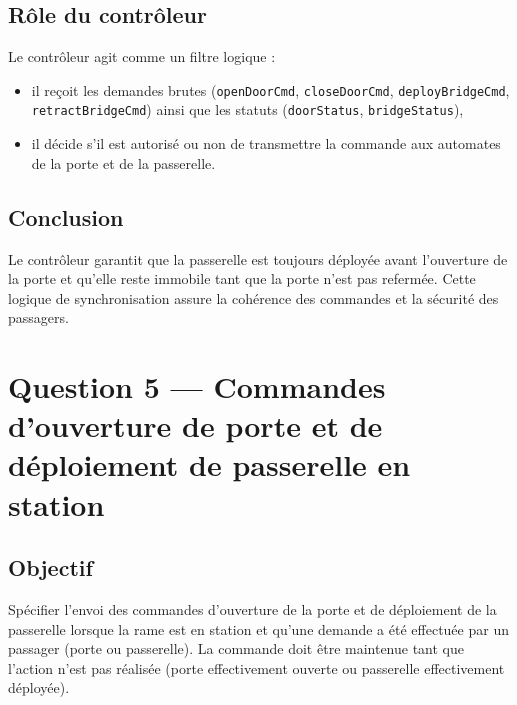 \documentclass[11pt,a4paper]{report}
\begin{document}
\section*{Rôle du contrôleur}
Le contrôleur agit comme un filtre logique :
\begin{itemize}
  \item il reçoit les demandes brutes (\texttt{openDoorCmd}, \texttt{closeDoorCmd}, \texttt{deployBridgeCmd}, \texttt{retractBridgeCmd}) ainsi que les statuts (\texttt{doorStatus}, \texttt{bridgeStatus}),
  \item il décide s’il est autorisé ou non de transmettre la commande aux automates de la porte et de la passerelle.
\end{itemize}

\section*{Conclusion}
Le contrôleur garantit que la passerelle est toujours déployée avant l’ouverture de la porte et qu’elle reste immobile tant que la porte n’est pas refermée.  
Cette logique de synchronisation assure la cohérence des commandes et la sécurité des passagers.


\chapter{Question 5 — Commandes d’ouverture de porte et de déploiement de passerelle en station}

\section*{Objectif}
Spécifier l’envoi des commandes d’ouverture de la porte et de déploiement de la passerelle lorsque la rame est en station et qu’une demande a été effectuée par un passager (porte ou passerelle).  
La commande doit être maintenue tant que l’action n’est pas réalisée (porte effectivement ouverte ou passerelle effectivement déployée).
\end{document}
